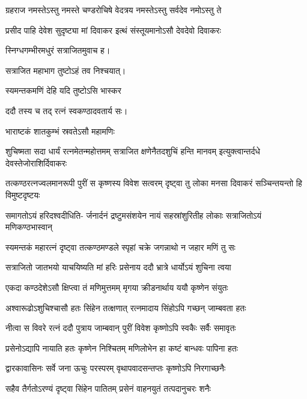 \begin{center}
\twolineshloka
{ग्रहराज नमस्तेऽस्तु नमस्ते चण्डरोचिषे}
{वेदत्रय नमस्तेऽस्तु सर्वदेव नमोऽस्तु ते}%

\twolineshloka
{प्रसीद पाहि देवेश सुदृष्ट्या मां दिवाकर}
{इत्थं संस्तूयमानोऽसौ देवदेवो दिवाकरः}%

{स्निग्धगम्भीरमधुरं सत्राजितमुवाच ह।}



{सत्राजित महाभाग तुष्टोऽहं तव निश्चयात्।}


\onelineshloka
{स्यमन्तकमणिं देहि यदि तुष्टोऽसि भास्कर}%

{ददौ तस्य च तद् रत्नं स्वकण्ठादवतार्य सः।}

\onelineshloka
{भाराष्टकं शातकुम्भं स्रवतेऽसौ महामणिः}%

\threelineshloka
{शुचिष्मता सदा धार्यं रत्नमेतन्महोत्तमम्}
{सत्राजित क्षणेनैतदशुचिं हन्ति मानवम्}
{इत्युक्त्वान्तर्दधे देवस्तेजोराशिर्दिवाकरः}%

\fourlineindentedshloka
{तत्कण्ठरत्नज्वलमानरूपी}
{पुरीं स कृष्णस्य विवेश सत्वरम्} 
{दृष्ट्वा तु लोका मनसा दिवाकरं}
{सञ्चिन्तयन्तो हि विमुष्टदृष्टयः}%

\fourlineindentedshloka
{समागतोऽयं हरिदश्वदीधिति-}
{र्जनार्दनं द्रष्टुमसंशयेन} 
{नायं सहस्रांशुरितीह लोकाः}
{सत्राजितोऽयं मणिकण्ठभास्वान्}%

\twolineshloka
{स्यमन्तकं महारत्नं दृष्ट्वा तत्कण्ठमण्डले}
{स्पृहां चक्रे जगन्नाथो न जहार मणिं तु सः}%

\twolineshloka
{सत्राजितो जातभयो याचयिष्यति मां हरिः}
{प्रसेनाय ददौ भ्रात्रे धार्योऽयं शुचिना त्वया}%

\twolineshloka
{एकदा कण्ठदेशेऽसौ क्षिप्त्वा तं मणिमुत्तमम्}
{मृगया क्रीडनार्थाय ययौ कृष्णेन संयुतः}%

\twolineshloka
{अश्वारूढोऽशुचिश्चासौ हतः सिंहेन तत्क्षणात्}
{रत्नमादाय सिंहोऽपि गच्छन् जाम्बवता हतः}%

\twolineshloka
{नीत्वा स विवरे रत्नं ददौ पुत्राय जाम्बवान्}
{पुरीं विवेश कृष्णोऽपि स्वकैः सर्वैः समावृतः}%

\twolineshloka
{प्रसेनोऽद्यापि नायाति हतः कृष्णेन निश्चितम्}
{मणिलोभेन हा कष्टं बान्धवः पापिना हतः}%

\twolineshloka
{द्वारकावासिनः सर्वे जना ऊचुः परस्परम्}
{वृथापवादसन्तप्तः कृष्णोऽपि निरगाच्छनैः}%

\twolineshloka
{सहैव तैर्गतोऽरण्यं दृष्ट्वा सिंहेन पातितम्}
{प्रसेनं वाहनयुतं तत्पदानुचरः शनैः}%


\end{center}
